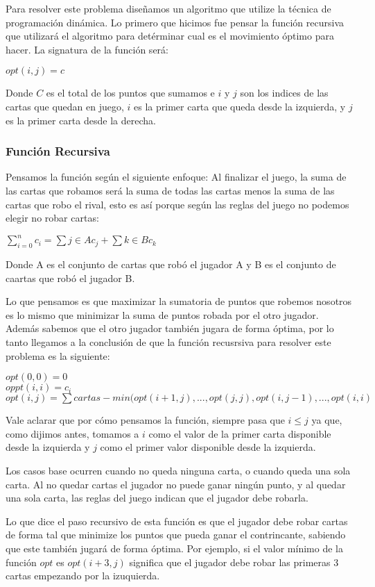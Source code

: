 Para resolver este problema diseñamos un algoritmo que utilize la técnica de programación dinámica. Lo primero que hicimos fue pensar la función recursiva que utilizará el algoritmo para detérminar cual es el movimiento óptimo para hacer. La signatura de la función será:

$opt(i,j) = c$

Donde $C$ es el total de los puntos que sumamos e $i$ y $j$ son los indices de las cartas que quedan en juego, $i$ es la primer carta que queda desde la izquierda, y $j$ es la primer carta desde la derecha.

\subsubsection{Función Recursiva}

Pensamos la función según el siguiente enfoque: Al finalizar el juego, la suma de las cartas que robamos será la suma de todas las cartas menos la suma de las cartas que robo el rival, esto es así porque según las reglas del juego no podemos elegir no robar cartas:

$\sum_{i=0}^{n} c_i = \sum{j \in A} c_j + \sum{k \in B} c_k$

Donde A es el conjunto de cartas que robó el jugador A y B es el conjunto de caartas que robó el jugador B.

Lo que pensamos es que maximizar la sumatoria de puntos que robemos nosotros es lo mismo que minimizar la suma de puntos robada por el otro jugador. Además sabemos que el otro jugador también jugara de forma óptima, por lo tanto llegamos a la conclusión de que la función recusrsiva para resolver este problema es la siguiente:

$opt(0,0) = 0$ \\
$oppt(i,i) = c_i$ \\
$opt(i,j) = \sum cartas - min(opt(i+1, j), ..., opt(j,j), opt(i, j-1), ... ,opt(i,i)$

Vale aclarar que por cómo pensamos la función, siempre pasa que $i \leq j$ ya que, como dijimos antes, tomamos a $i$ como el valor de la primer carta disponible desde la izquierda y $j$ como el primer valor disponible desde la izquierda.

Los casos base ocurren cuando no queda ninguna carta, o cuando queda una sola carta. Al no quedar cartas el jugador no puede ganar ningún punto, y al quedar una sola carta, las reglas del juego indican que el jugador debe robarla.

Lo que dice el paso recursivo de esta función es que el jugador debe robar cartas de forma tal que minimize los puntos que pueda ganar el contrincante, sabiendo que este también jugará de forma óptima. Por ejemplo, si el valor mínimo de la función $opt$ es $opt(i+3,j)$ significa que el jugador debe robar las primeras 3 cartas empezando por la izuquierda.

